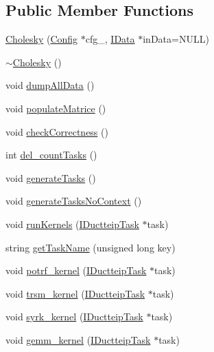 \subsection*{Public Member Functions}
\begin{DoxyCompactItemize}
\item 
\hyperlink{class_cholesky_ae3a7112a8c31a3a11ce7ff63f8940f9d}{Cholesky} (\hyperlink{class_config}{Config} $\ast$cfg\_\-, \hyperlink{class_i_data}{IData} $\ast$inData=NULL)
\item 
\hyperlink{class_cholesky_aed950ac074bea0a0df52749af3944d6a}{$\sim$Cholesky} ()
\item 
void \hyperlink{class_cholesky_a91ddf85d95bbf73cb8e2cdb1ddfa7d4c}{dumpAllData} ()
\item 
void \hyperlink{class_cholesky_ae5281abaa5b986b2dc88fff04aed959c}{populateMatrice} ()
\item 
void \hyperlink{class_cholesky_a56a5e5399cd1dff87c123119fff14667}{checkCorrectness} ()
\item 
int \hyperlink{class_cholesky_a8e1c4a4d12d3989a41c09cafad8c8933}{del\_\-countTasks} ()
\item 
void \hyperlink{class_cholesky_adadbc20c3a9481c909c8143985fbf0e1}{generateTasks} ()
\item 
void \hyperlink{class_cholesky_a718109d74c3316742c6accccdb010a92}{generateTasksNoContext} ()
\item 
void \hyperlink{class_cholesky_ab025e03f8a91169e1945602f0020b61e}{runKernels} (\hyperlink{class_i_ductteip_task}{IDuctteipTask} $\ast$task)
\item 
string \hyperlink{class_cholesky_abba68c13e63db6e4f3637e0d68af9c45}{getTaskName} (unsigned long key)
\item 
void \hyperlink{class_cholesky_a603fc15661c381e10c8f1fc535ec48e5}{potrf\_\-kernel} (\hyperlink{class_i_ductteip_task}{IDuctteipTask} $\ast$task)
\item 
void \hyperlink{class_cholesky_ab0b681bba7b9c3f706d18a6d15fe905f}{trsm\_\-kernel} (\hyperlink{class_i_ductteip_task}{IDuctteipTask} $\ast$task)
\item 
void \hyperlink{class_cholesky_aa448c6006ef1b072de230dc5427372e9}{syrk\_\-kernel} (\hyperlink{class_i_ductteip_task}{IDuctteipTask} $\ast$task)
\item 
void \hyperlink{class_cholesky_a8891a656d18c8e11e8e26447cebc9348}{gemm\_\-kernel} (\hyperlink{class_i_ductteip_task}{IDuctteipTask} $\ast$task)
\end{DoxyCompactItemize}


